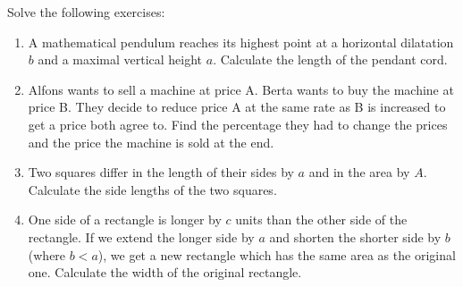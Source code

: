 \newpage
\begin{exer}
Solve the following exercises:
\begin{enumerate}[label=\emph{\alph*})]

\item A mathematical pendulum reaches its highest point at a horizontal dilatation $b$ and a maximal vertical height $a$. Calculate the length of the pendant cord. 
\vfill

\item Alfons wants to sell a machine at price A. Berta wants to buy the machine at price B. They decide to reduce price A at the same rate as B is increased to get a price both agree to.
  Find the percentage they had to change the prices and the price the machine is sold at the end.
\vfill
\newpage

\item Two squares differ in the length of their sides by $a$ and in the area by $A$. Calculate the side lengths of the two squares. 
\vfill

\item One side of a rectangle is longer by $c$ units than the other side of the rectangle. If we extend the longer side by $a$ and shorten the shorter side by $b$ (where $b<a$), we get a new rectangle which has the same area as the original one. Calculate the width of the original rectangle. 
\vfill


\end{enumerate}
\end{exer}
